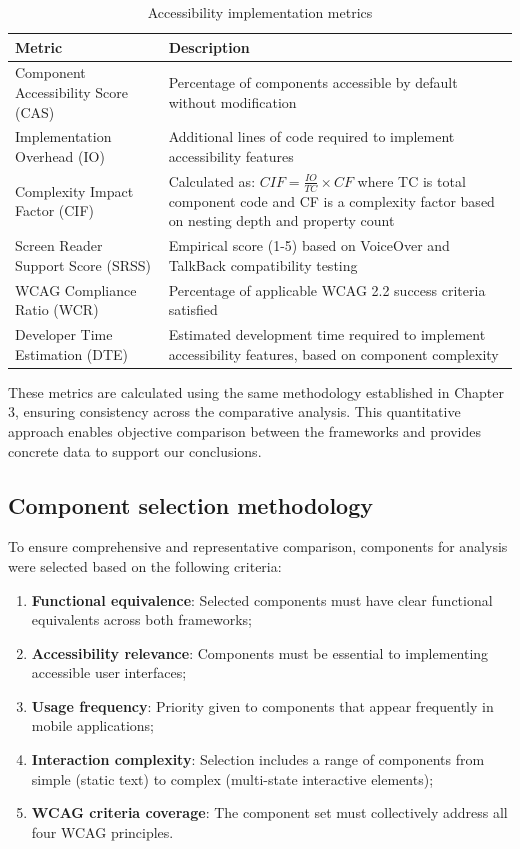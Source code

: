 \begin{table}[ht]
\caption{Accessibility implementation metrics}
\label{tab:accessibility_metrics}
\centering
\begin{tabular}{|p{4cm}|p{10cm}|}
\hline
\textbf{Metric} & \textbf{Description} \\
\hline
Component Accessibility Score (CAS) & Percentage of components accessible by default without modification \\
\hline
Implementation Overhead (IO) & Additional lines of code required to implement accessibility features \\
\hline
Complexity Impact Factor (CIF) & Calculated as: $CIF = \frac{IO}{TC} \times CF$ where TC is total component code and CF is a complexity factor based on nesting depth and property count \\
\hline
Screen Reader Support Score (SRSS) & Empirical score (1-5) based on VoiceOver and TalkBack compatibility testing \\
\hline
WCAG Compliance Ratio (WCR) & Percentage of applicable WCAG 2.2 success criteria satisfied \\
\hline
Developer Time Estimation (DTE) & Estimated development time required to implement accessibility features, based on component complexity \\
\hline
\end{tabular}
\end{table}

These metrics are calculated using the same methodology established in Chapter 3, ensuring consistency across the comparative analysis. This quantitative approach enables objective comparison between the frameworks and provides concrete data to support our conclusions.

\subsection{Component selection methodology}

To ensure comprehensive and representative comparison, components for analysis were selected based on the following criteria:

\begin{enumerate}
    \item \textbf{Functional equivalence}: Selected components must have clear functional equivalents across both frameworks;
    
    \item \textbf{Accessibility relevance}: Components must be essential to implementing accessible user interfaces;
    
    \item \textbf{Usage frequency}: Priority given to components that appear frequently in mobile applications;
    
    \item \textbf{Interaction complexity}: Selection includes a range of components from simple (static text) to complex (multi-state interactive elements);
    
    \item \textbf{WCAG criteria coverage}: The component set must collectively address all four WCAG principles.
\end{enumerate}

